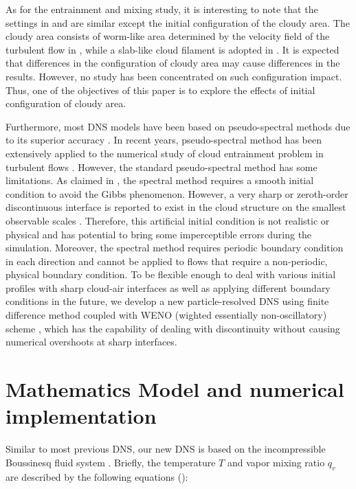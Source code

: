 As for the entrainment and mixing study, it is interesting to note that the
settings in \cite{Kumar11} and \cite{And04} are similar except the initial
configuration of the cloudy area. The cloudy area consists of worm-like area
determined by the velocity field of the turbulent flow in \cite{And04}, while a
slab-like cloud filament is adopted in \cite{Kumar11}. It is expected that
differences in the configuration of cloudy area may cause differences in the
results. However, no study has been concentrated on such configuration impact.
Thus, one of the objectives of this paper is to explore the effects of initial
configuration of cloudy area.

Furthermore, most DNS models have been based on pseudo-spectral methods due to
its superior accuracy \cite{Rogallo81,Orszag72}. In recent years,
pseudo-spectral method has been extensively applied to the numerical study of
cloud entrainment problem in turbulent flows \cite{And04,Celani05,Kumar11}.
However, the standard pseudo-spectral method has some limitations. As claimed
in \cite{Kumar11}, the spectral method requires a smooth initial condition to
avoid the Gibbs phenomenon. However, a very sharp or zeroth-order discontinuous
interface is reported to exist in the cloud structure on the smallest
observable scales \cite{Brenguier1993}. Therefore, this artificial initial
condition is not realistic or physical and has potential to bring some
imperceptible errors during the simulation. Moreover, the spectral method
requires periodic boundary condition in each direction and cannot be applied to
flows that require a non-periodic, physical boundary condition. To be flexible
enough to deal with various initial profiles with sharp cloud-air interfaces as
well as applying different boundary conditions in the future, we develop a new
particle-resolved DNS using finite difference method coupled with WENO (wighted
essentially non-oscillatory) scheme \cite{WENO96}, which has the capability of
dealing with discontinuity without causing numerical overshoots at sharp
interfaces.

\section{Mathematics Model and numerical implementation}
Similar to most previous DNS, our new DNS is based on the incompressible
Boussinesq fluid system \cite{And04}. Briefly, the temperature $T$ and vapor
mixing ratio $q_v$ are described by the following equations (\cite{Kumar11}):

